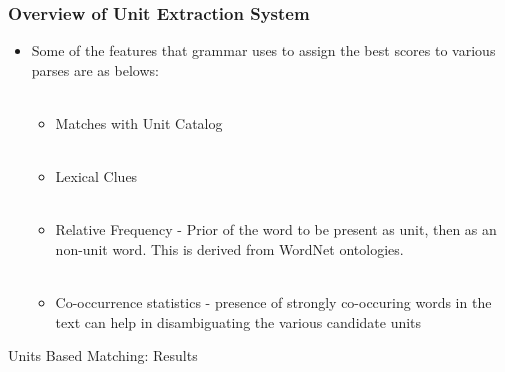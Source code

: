 \documentclass{beamer}
\begin{document}
\begin{frame}
 \frametitle{Overview of Unit Extraction System}
 \begin{itemize}
  \item Some of the features that grammar uses to assign the best scores to various 
parses are as belows: \pause \\~\\
    \begin{itemize}
        \item Matches with Unit Catalog \pause \\~\\
	\item Lexical Clues \pause \\~\\
	\item Relative Frequency - Prior of the word to be present as unit, then as an
	  non-unit word. This is derived from WordNet ontologies. \pause \\~\\
	\item Co-occurrence statistics - presence of strongly co-occuring words in the
	  text can help in disambiguating the various candidate units 
    \end{itemize}
 \end{itemize}
 
\end{frame}

\begin{frame}{Units Based Matching: Results}
\begin{center}
\end{center}
\end{frame}
\end{document}
